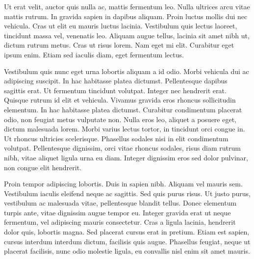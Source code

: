 \documentclass[journal]{IEEEtran}
\begin{document}
Ut erat velit, auctor quis nulla ac, mattis fermentum leo. Nulla ultrices arcu vitae mattis rutrum. In gravida sapien in dapibus aliquam. Proin luctus mollis dui nec vehicula. Cras ut elit eu mauris luctus lacinia. Vestibulum quis lectus laoreet, tincidunt massa vel, venenatis leo. Aliquam augue tellus, lacinia sit amet nibh ut, dictum rutrum metus. Cras ut risus lorem. Nam eget mi elit. Curabitur eget ipsum enim. Etiam sed iaculis diam, eget fermentum lectus.

Vestibulum quis nunc eget urna lobortis aliquam a id odio. Morbi vehicula dui ac adipiscing suscipit. In hac habitasse platea dictumst. Pellentesque dapibus sagittis erat. Ut fermentum tincidunt volutpat. Integer nec hendrerit erat. Quisque rutrum id elit et vehicula. Vivamus gravida eros rhoncus sollicitudin elementum. In hac habitasse platea dictumst. Curabitur condimentum placerat odio, non feugiat metus vulputate non. Nulla eros leo, aliquet a posuere eget, dictum malesuada lorem. Morbi varius lectus tortor, in tincidunt orci congue in. Ut rhoncus ultricies scelerisque. Phasellus sodales nisi in elit condimentum volutpat. Pellentesque dignissim, orci vitae rhoncus sodales, risus diam rutrum nibh, vitae aliquet ligula urna eu diam. Integer dignissim eros sed dolor pulvinar, non congue elit hendrerit.

Proin tempor adipiscing lobortis. Duis in sapien nibh. Aliquam vel mauris sem. Vestibulum iaculis eleifend neque ac sagittis. Sed quis purus risus. Ut justo purus, vestibulum ac malesuada vitae, pellentesque blandit tellus. Donec elementum turpis ante, vitae dignissim augue tempor eu. Integer gravida erat ut neque fermentum, vel adipiscing mauris consectetur. Cras a ligula lacinia, hendrerit dolor quis, lobortis magna. Sed placerat cursus erat in pretium. Etiam est sapien, cursus interdum interdum dictum, facilisis quis augue. Phasellus feugiat, neque ut placerat facilisis, nunc odio molestie ligula, eu convallis nisl enim sit amet mauris.



\end{document}

